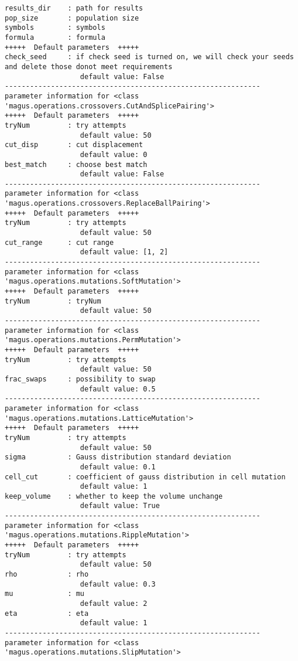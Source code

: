 \documentclass[12pt,oneside]{book}
\begin{document}
\begin{tcolorbox}
\begin{verbatim}
results_dir    : path for results
pop_size       : population size
symbols        : symbols
formula        : formula
+++++  Default parameters  +++++
check_seed     : if check seed is turned on, we will check your seeds and delete those donot meet requirements
                  default value: False
-------------------------------------------------------------
parameter information for <class 'magus.operations.crossovers.CutAndSplicePairing'>
+++++  Default parameters  +++++
tryNum         : try attempts
                  default value: 50
cut_disp       : cut displacement
                  default value: 0
best_match     : choose best match
                  default value: False
-------------------------------------------------------------
parameter information for <class 'magus.operations.crossovers.ReplaceBallPairing'>
+++++  Default parameters  +++++
tryNum         : try attempts
                  default value: 50
cut_range      : cut range
                  default value: [1, 2]
-------------------------------------------------------------
parameter information for <class 'magus.operations.mutations.SoftMutation'>
+++++  Default parameters  +++++
tryNum         : tryNum
                  default value: 50
-------------------------------------------------------------
parameter information for <class 'magus.operations.mutations.PermMutation'>
+++++  Default parameters  +++++
tryNum         : try attempts
                  default value: 50
frac_swaps     : possibility to swap
                  default value: 0.5
-------------------------------------------------------------
parameter information for <class 'magus.operations.mutations.LatticeMutation'>
+++++  Default parameters  +++++
tryNum         : try attempts
                  default value: 50
sigma          : Gauss distribution standard deviation
                  default value: 0.1
cell_cut       : coefficient of gauss distribution in cell mutation
                  default value: 1
keep_volume    : whether to keep the volume unchange
                  default value: True
-------------------------------------------------------------
parameter information for <class 'magus.operations.mutations.RippleMutation'>
+++++  Default parameters  +++++
tryNum         : try attempts
                  default value: 50
rho            : rho
                  default value: 0.3
mu             : mu
                  default value: 2
eta            : eta
                  default value: 1
-------------------------------------------------------------
parameter information for <class 'magus.operations.mutations.SlipMutation'>

\end{verbatim}
\end{tcolorbox}
\end{document}
